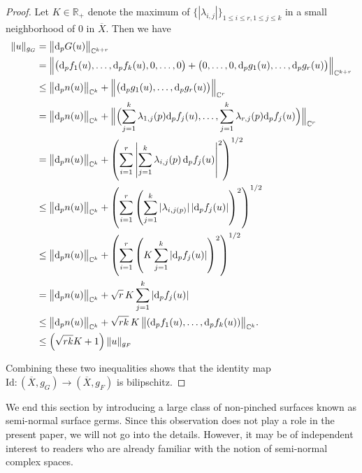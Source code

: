 \documentclass[reqno,dvipsnames,12pt]{amsart}
\begin{document}
\begin{proof}
Let $K \in \mathbb{R}_+$ denote the maximum of $\{|\lambda_{i,j}|\}_{1 \le i \le r, 1 \le j \le k}$ in a small neighborhood of $0$ in $\overline{X}$. Then we have
$$
\begin{aligned}
\|u\|_{g_G} 
&= \bigl\|\mathrm{d}_p G(u)\bigr\|_{\mathbb{C}^{k+r}} \\
&= \Bigl\|\bigl(\mathrm{d}_p f_1(u), \dots, \mathrm{d}_p f_k(u), 0, \dots, 0\bigr) 
        + \bigl(0, \dots, 0, \mathrm{d}_p g_1(u), \dots, \mathrm{d}_p g_r(u)\bigr)\Bigr\|_{\mathbb{C}^{k+r}} \\
&\le \bigl\|\mathrm{d}_p n(u)\bigr\|_{\mathbb{C}^{k}} 
     + \Bigl\| \bigl(\mathrm{d}_p g_1(u), \dots, \mathrm{d}_p g_r(u)\bigr)\Bigr\|_{\mathbb{C}^r} \\
&= \bigl\|\mathrm{d}_p n(u)\bigr\|_{\mathbb{C}^{k}} 
   + \Bigl\| \Bigl(\sum_{j=1}^k \lambda_{1,j}(p) \mathrm{d}_p f_j(u), \dots, \sum_{j=1}^k \lambda_{r,j}(p) \mathrm{d}_p f_j(u)\Bigr)\Bigr\|_{\mathbb{C}^r} \\
&= \bigl\|\mathrm{d}_p n(u)\bigr\|_{\mathbb{C}^{k}} 
   +\left(\sum_{i=1}^r \left|\sum_{j=1}^k \lambda_{i,j}(p)\,\mathrm{d}_p f_j(u)\right|^2 \right)^{1/2} \\
&\le \bigl\|\mathrm{d}_p n(u)\bigr\|_{\mathbb{C}^{k}} 
   +\left(\sum_{i=1}^r \left(\sum_{j=1}^k |\lambda_{i,j(p)}|\,|\mathrm{d}_p f_j(u)|\right)^2 \right)^{1/2} \\
&\le \bigl\|\mathrm{d}_p n(u)\bigr\|_{\mathbb{C}^{k}} 
   +\left(\sum_{i=1}^r \left(K \sum_{j=1}^k |\mathrm{d}_p f_j(u)|\right)^2 \right)^{1/2} \\
&= \bigl\|\mathrm{d}_p n(u)\bigr\|_{\mathbb{C}^{k}} + \sqrt{r}\,K \sum_{j=1}^k |\mathrm{d}_p f_j(u)| \\
&\le \bigl\|\mathrm{d}_p n(u)\bigr\|_{\mathbb{C}^{k}} 
   +\sqrt{rk}\,K\,
\bigl\|(\mathrm{d}_p f_1(u),\dots,\mathrm{d}_p f_k(u))\bigr\|_{\mathbb{C}^k}.\\
&\le \left( \sqrt{rk}K+1\right) \|u\|_{g_F} 
\end{aligned}
$$

Combining these two inequalities shows that the identity map $\mathrm{Id} : (\overline{X}, g_G) \longrightarrow (\overline{X}, g_F)$ is bilipschitz. \end{proof}






We end this section by introducing  a large class of non-pinched surfaces known as semi-normal surface germs. Since this observation does not play a role in the present paper, we will not go into the details. However, it may be of independent interest to readers who are already familiar with the notion of semi-normal complex spaces.
\end{document}

